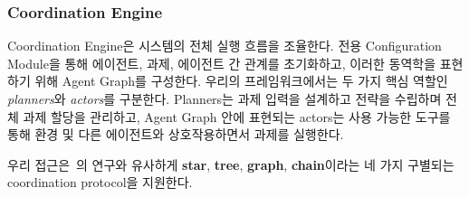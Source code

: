 
\subsubsection{Coordination Engine}
Coordination Engine은 시스템의 전체 실행 흐름을 조율한다. 전용 Configuration Module을 통해 에이전트, 과제, 에이전트 간 관계를 초기화하고, 이러한 동역학을 표현하기 위해 Agent Graph를 구성한다. 우리의 프레임워크에서는 두 가지 핵심 역할인 \emph{planners}와 \emph{actors}를 구분한다. Planners는 과제 입력을 설계하고 전략을 수립하며 전체 과제 할당을 관리하고, Agent Graph 안에 표현되는 actors는 사용 가능한 도구를 통해 환경 및 다른 에이전트와 상호작용하면서 과제를 실행한다.

우리 접근은~\citet{qian2025scaling}의 연구와 유사하게 \textbf{star}, \textbf{tree}, \textbf{graph}, \textbf{chain}이라는 네 가지 구별되는 coordination protocol을 지원한다.


